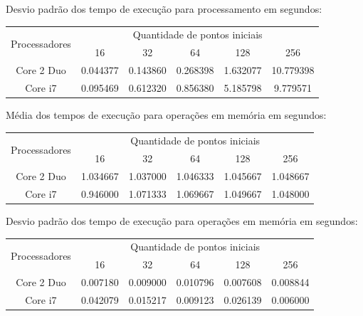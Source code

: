     \noindent Desvio padrão dos tempo de execução para processamento em segundos:\\
    \begin{tabular}{| c | c | c | c | c | c |}
      \hline
      \multirow{2}{*}{Processadores}& \multicolumn{5}{|c|}{Quantidade de pontos iniciais} \\ \cline{2-6}
      & 16 & 32 & 64 & 128 & 256 \\ \hline
      Core 2 Duo & 0.044377 & 0.143860 & 0.268398 & 1.632077 & 10.779398 \\ \hline
      Core i7 &  0.095469 & 0.612320 & 0.856380 & 5.185798 & 9.779571 \\ \hline

      \hline
    \end{tabular}
    
    \hspace{1mm}\newline
    
    \noindent Média dos tempos de execução para operações em memória em segundos:\\
    \begin{tabular}{| c | c | c | c | c | c |}
      \hline
      \multirow{2}{*}{Processadores}& \multicolumn{5}{|c|}{Quantidade de pontos iniciais} \\ \cline{2-6}
      & 16 & 32 & 64 & 128 & 256 \\ \hline
      Core 2 Duo & 1.034667 & 1.037000 & 1.046333 & 1.045667 & 1.048667\\ \hline
      Core i7 & 0.946000 & 1.071333 & 1.069667 & 1.049667 & 1.048000\\ \hline

      \hline
    \end{tabular}
    
    \hspace{1mm}\newline
    
    \noindent Desvio padrão dos tempo de execução para operações em memória em segundos:\\
    \begin{tabular}{| c | c | c | c | c | c |}
      \hline
      \multirow{2}{*}{Processadores}& \multicolumn{5}{|c|}{Quantidade de pontos iniciais} \\ \cline{2-6}
      & 16 & 32 & 64 & 128 & 256 \\ \hline
      Core 2 Duo & 0.007180 & 0.009000 & 0.010796 & 0.007608 & 0.008844\\ \hline
      Core i7 & 0.042079 & 0.015217 & 0.009123 & 0.026139 & 0.006000 \\ \hline

      \hline
    \end{tabular}
    
